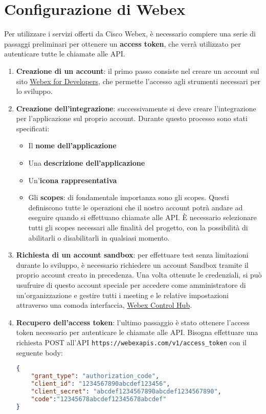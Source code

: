 \section{Configurazione di Webex}
Per utilizzare i servizi offerti da Cisco Webex, è necessario compiere una serie di passaggi
preliminari per ottenere un \textbf{access token}, che verrà utilizzato per autenticare tutte le chiamate alle API.

\begin{enumerate}

    \item \textbf{Creazione di un account}: il primo passo consiste nel creare
    un account sul sito \href{https://developer.webex.com/}{Webex for Developers}, che permette 
    l'accesso agli strumenti necessari per lo sviluppo.
    
    \item \textbf{Creazione dell'integrazione}: successivamente si deve creare l'integrazione per 
    l'applicazione sul proprio account. Durante questo processo sono stati specificati:
        \begin{itemize}
            \item Il \textbf{nome dell'applicazione}
            \item Una \textbf{descrizione dell'applicazione}
            \item Un'\textbf{icona rappresentativa}
            \item Gli \textbf{scopes}: di fondamentale importanza sono gli scopes. Questi definiscono tutte le operazioni
            che il nostro account potrà andare ad eseguire  quando si effettuano chiamate alle API. È necessario
            selezionare tutti gli scopes necessari alle finalità del progetto, con la possibilità di abilitarli 
            o disabilitarli in qualsiasi momento.
        \end{itemize}
 
    \item \textbf{Richiesta di un account sandbox}: per effettuare test senza limitazioni durante lo sviluppo,
    è necessario richiedere un account Sandbox tramite il proprio account creato in precedenza. Una volta ottenute
    le credenziali, si può usufruire di questo account speciale per accedere come amministratore di un'organizzazione 
    e gestire tutti i meeting e le relative impostazioni attraverso una comoda interfaccia, 
    \href{https://admin.webex.com/login}{Webex Control Hub}.
    \cite{WebexSandboxAccount}
    
    \item \textbf{Recupero dell'access token}: l'ultimo passaggio è stato ottenere l'access token 
    necessario per autenticare le chiamate alle API.
    Bisogna effettuare una richiesta POST all'API
    \texttt{https://webexapis.com/v1/access\_token} con il seguente body:
    \begin{lstlisting}[language=json,firstnumber=1]
{
    "grant_type": "authorization_code",
    "client_id": "1234567890abcdef123456",
    "client_secret": "abcdef1234567890abcdef1234567890",
    "code":"12345678abcdef12345678abcdef"
}
    \end{lstlisting}


\end{enumerate}
